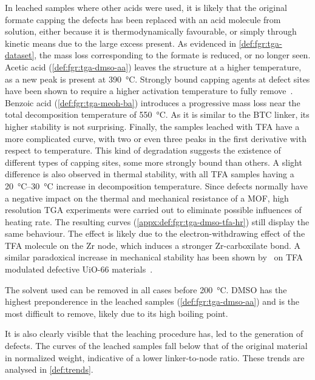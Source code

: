 In leached samples where other acids were used,
it is likely that the original formate capping the defects 
has been replaced with an acid molecule from solution,
either because it is thermodynamically favourable, or simply through 
kinetic means due to the large excess present.
As evidenced in \autoref{def:fgr:tga-dataset}, the mass 
loss corresponding to the formate is reduced, or no longer seen. 
Acetic acid (\autoref{def:fgr:tga-dmso-aa}) leaves the 
structure at a higher temperature, as
a new peak is present at \SI{390}{\degreeCelsius}. Strongly
bound capping agents at defect sites have been shown to 
require a higher activation temperature to fully
remove~\cite{jiaoHeatTreatmentDefectiveUiO662017}.
Benzoic acid (\autoref{def:fgr:tga-meoh-ba}) introduces a progressive 
mass loss near the total decomposition temperature 
of \SI{550}{\degreeCelsius}.
As it is similar to the BTC linker, its higher stability
is not surprising. Finally, the samples leached with 
TFA have a more complicated curve, with two or even 
three peaks in the first derivative with respect to temperature.
This kind of degradation suggests the existence of different types
of capping sites, some more strongly bound than others.
A slight difference is also observed in thermal stability,
with all TFA samples having a \SIrange{20}{30}{\degreeCelsius}
increase in decomposition temperature. Since defects normally
have a negative impact on the thermal and mechanical resistance 
of a MOF, high resolution TGA experiments were carried out
to eliminate possible influences of heating rate. The resulting
curves (\autoref{appx:def:fgr:tga-dmso-tfa-hr}) still display 
the same behaviour. The effect is likely due to the
electron-withdrawing effect of the TFA molecule on the Zr 
node, which induces a stronger Zr-carboxilate bond. A similar
paradoxical increase in mechanical stability has been shown 
by~\citeauthor{vandevoordeImprovingMechanicalStability2015} on 
TFA modulated defective UiO-66 
materials~\cite{vandevoordeImprovingMechanicalStability2015}.

The solvent used can be removed in all cases before 
\SI{200}{\degreeCelsius}. DMSO has the highest
preponderence in the leached samples (\autoref{def:fgr:tga-dmso-aa}) 
and is the most difficult to remove, likely due to its high boiling point.

It is also clearly visible that the leaching procedure has,
led to the generation of defects. The curves 
of the leached samples fall below that of the original material
in normalized weight, indicative of a lower linker-to-node ratio.
These trends are analysed in \autoref{def:trends}.